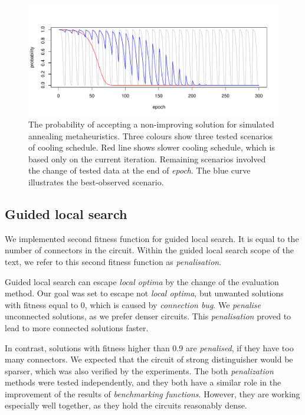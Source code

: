 \documentclass[
  print, %
  Table,   %
  nolof,     %
  nolot,     %
  11pt, %
  oneside  %
]{fithesis3}
\begin{document}
\begin{figure}
\centering
    \includegraphics[width=\textwidth]{./graphics/sa_prob}
    \caption{The probability of accepting a non-improving solution for simulated annealing metaheuristics. Three colours show three tested scenarios of cooling schedule. Red line shows slower cooling schedule, which is based only on the current iteration. Remaining scenarios involved the change of tested data at the end of \textit{epoch}. The blue curve illustrates the best-observed scenario.}
\label{fig:sa-cooling-scenarios}
\end{figure}

\subsection{Guided local search}
\label{subsec:res-ss-gls}

We implemented second fitness function for guided local search. It is equal to the number of connectors in the circuit. Within the guided local search scope of the text, we refer to this second fitness function as \textit{penalisation}.

Guided local search can escape \textit{local optima} by the change of the evaluation method. Our goal was set to escape not \textit{local optima}, but unwanted solutions with fitness equal to 0, which is caused by \textit{connection bug}. We \textit{penalise} unconnected solutions, as we prefer denser circuits. This \textit{penalisation} proved to lead to more connected solutions faster.

In contrast, solutions with fitness higher than 0.9 are \textit{penalised}, if they have too many connectors. We expected that the circuit of strong distinguisher would be sparser, which was also verified by the experiments. The both \textit{penalization} methods were tested independently, and they both have a similar role in the improvement of the results of \textit{benchmarking functions}. However, they are working especially well together, as they hold the circuits reasonably dense.
\end{document}
